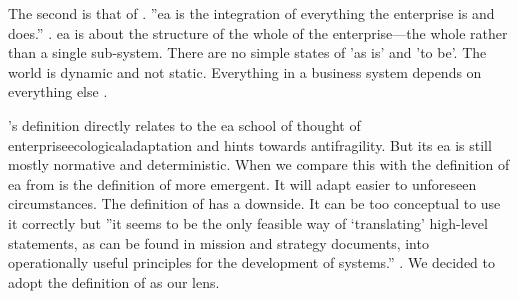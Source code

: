 The second is that of \textcite{Graves2008}. ''\gls{ea} is the integration of everything the enterprise is and does.'' \parencite[p.~1]{Graves2008}. \gls{ea} is about the structure of the whole of the enterprise—the whole rather than a single sub-system. There are no simple states of 'as is' and 'to be'. The world is dynamic and not static. Everything in a business system depends on everything else \parencite[p.~14]{Graves2008}.

\citeauthor{Graves2008}'s definition directly relates to the \gls{ea} school of thought of \gls{enterpriseecologicaladaptation} and hints towards \gls{antifragility}. But its \gls{ea} is still mostly normative and deterministic. When we compare this with the definition of \gls{ea} from \textcite{Dietz2008} is the definition of \citeauthor{Dietz2008} more emergent. It will adapt easier to unforeseen circumstances. The definition of \textcite{Dietz2008} has a downside. It can be too conceptual to use it correctly but ''it seems to be the only feasible way of ‘translating’ high-level statements, as can be found in mission and strategy documents, into operationally useful principles for the development of systems.'' \parencite[p.~53]{Dietz2008}. We decided to adopt the definition of \textcite{Dietz2008} as our lens.

